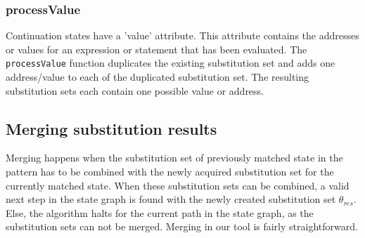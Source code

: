 \subsubsection{processValue}
Continuation states have a 'value' attribute. This attribute contains the addresses or values for an expression or statement that has been evaluated. The \texttt{processValue} function duplicates the existing substitution set and adds one address/value to each of the duplicated substitution set. The resulting substitution sets each contain one possible value or address.



\subsection{Merging substitution results}
\label{subsec:merging}

Merging happens when the substitution set of previously matched state in the pattern has to be combined with the newly acquired substitution set for the currently matched state. When these substitution sets can be combined, a valid next step in the state graph is found with the newly created substitution set $\theta_{res}$. Else, the algorithm halts for the current path in the state graph, as the substitution sets can not be merged. Merging in our tool is fairly straightforward. 

